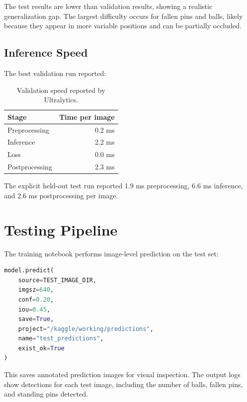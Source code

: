 \documentclass[12pt,a4paper]{article}
\begin{document}
The test results are lower than validation results, showing a realistic generalization gap. The largest difficulty occurs for fallen pins and balls, likely because they appear in more variable positions and can be partially occluded.

\subsection{Inference Speed}

The best validation run reported:
\begin{table}[H]
\centering
\caption{Validation speed reported by Ultralytics.}
\begin{tabular}{lr}
\toprule
\textbf{Stage} & \textbf{Time per image} \\
\midrule
Preprocessing & 0.2 ms \\
Inference & 2.2 ms \\
Loss & 0.0 ms \\
Postprocessing & 2.3 ms \\
\bottomrule
\end{tabular}
\end{table}

The explicit held-out test run reported 1.9 ms preprocessing, 6.6 ms inference, and 2.6 ms postprocessing per image.

\section{Testing Pipeline}

The training notebook performs image-level prediction on the test set:
\begin{lstlisting}[language=Python]
model.predict(
    source=TEST_IMAGE_DIR,
    imgsz=640,
    conf=0.20,
    iou=0.45,
    save=True,
    project="/kaggle/working/predictions",
    name="test_predictions",
    exist_ok=True
)
\end{lstlisting}

This saves annotated prediction images for visual inspection. The output logs show detections for each test image, including the number of balls, fallen pins, and standing pins detected.

\end{document}
